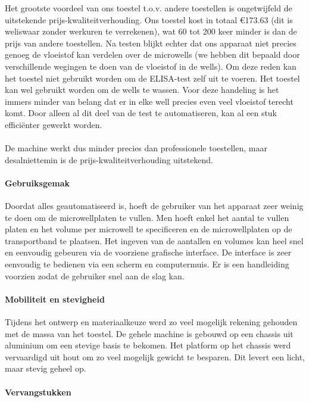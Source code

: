 \documentclass[a4paper,twoside,kulak]{kulakreport} %
\begin{document}
Het grootste voordeel van ons toestel t.o.v. andere toestellen is ongetwijfeld de uitstekende prijs-kwaliteitverhouding. Ons toestel kost in totaal \euro 173.63 (dit is weliswaar zonder werkuren te verrekenen), wat 60 tot 200 keer minder is dan de prijs van andere toestellen.
\newline
Na testen blijkt echter dat ons apparaat niet precies genoeg de vloeistof kan verdelen over de microwells (we hebben dit bepaald door verschillende wegingen te doen van de vloeistof in de wells). Om deze reden kan het toestel niet gebruikt worden om de ELISA-test zelf uit te voeren. Het toestel kan wel gebruikt worden om de wells te wassen. Voor deze handeling is het immers minder van belang dat er in elke well precies even veel vloeistof terecht komt. Door alleen al dit deel van de test te automatiseren, kan al een stuk efficiënter gewerkt worden. \\ \\
De machine werkt dus minder precies dan professionele toestellen, maar desalniettemin is de prijs-kwaliteitverhouding uitstekend.

\paragraph{Gebruiksgemak}

Doordat alles geautomatiseerd is, hoeft de gebruiker van het apparaat zeer weinig te doen om de microwellplaten te vullen. Men hoeft enkel het aantal te vullen platen en het volume per microwell te specificeren en de microwellplaten op de transportband te plaatsen. Het ingeven van de aantallen en volumes kan heel snel en eenvoudig gebeuren via de voorziene grafische interface. De interface is zeer eenvoudig te bedienen via een scherm en computermuis. Er is een handleiding voorzien zodat de gebruiker snel aan de slag kan.

\paragraph{Mobiliteit en stevigheid}

Tijdens het ontwerp en materiaalkeuze werd zo veel mogelijk rekening gehouden met de massa van het toestel. De gehele machine is gebouwd op een chassis uit aluminium om een stevige basis te bekomen. Het platform op het chassis werd vervaardigd uit hout om zo veel mogelijk gewicht te besparen. Dit levert een licht, maar stevig geheel op. 

\paragraph{Vervangstukken}
\end{document}
